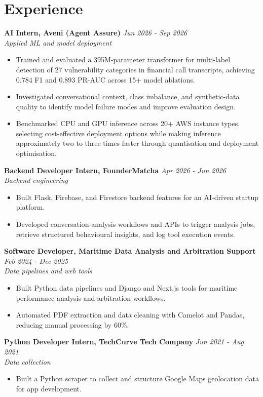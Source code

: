 \documentclass[a4paper,10pt]{article}
\newcommand{\cvrole}[3]{%
  \textbf{#1} \hfill \textit{#2}\\
  \textit{#3}
}
\begin{document}
\section*{Experience}
\cvrole{AI Intern, Aveni (Agent Assure)}{Jun 2026 - Sep 2026}{Applied ML and model deployment}
\begin{itemize}
  \item Trained and evaluated a 395M-parameter transformer for multi-label detection of 27 vulnerability categories in financial call transcripts, achieving 0.784 F1 and 0.893 PR-AUC across 15+ model ablations.
  \item Investigated conversational context, class imbalance, and synthetic-data quality to identify model failure modes and improve evaluation design.
  \item Benchmarked CPU and GPU inference across 20+ AWS instance types, selecting cost-effective deployment options while making inference approximately two to three times faster through quantisation and deployment optimisation.
\end{itemize}

\cvrole{Backend Developer Intern, FounderMatcha}{Apr 2026 - Jun 2026}{Backend engineering}
\begin{itemize}
  \item Built Flask, Firebase, and Firestore backend features for an AI-driven startup platform.
  \item Developed conversation-analysis workflows and APIs to trigger analysis jobs, retrieve structured behavioural insights, and log tool execution events.
\end{itemize}

\cvrole{Software Developer, Maritime Data Analysis and Arbitration Support}{Feb 2024 - Dec 2025}{Data pipelines and web tools}
\begin{itemize}
  \item Built Python data pipelines and Django and Next.js tools for maritime performance analysis and arbitration workflows.
  \item Automated PDF extraction and data cleaning with Camelot and Pandas, reducing manual processing by 60\%.
\end{itemize}

\cvrole{Python Developer Intern, TechCurve Tech Company}{Jun 2021 - Aug 2021}{Data collection}
\begin{itemize}
  \item Built a Python scraper to collect and structure Google Maps geolocation data for app development.
\end{itemize}
\end{document}
